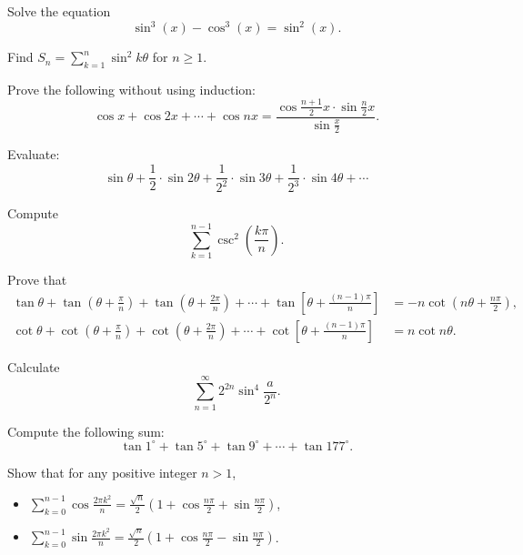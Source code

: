 \begin{question} Solve the equation \[ \sin^3 \left( x \right) - \cos^3 \left( x \right) = \sin^2 \left( x \right).\]
\end{question}


\begin{question} Find $S_n=\sum_{k=1}^n\sin^2 k\theta$ for $n\geqslant 1$.
\end{question}



\begin{question} Prove the following without using induction:
\[\cos x + \cos 2x + \cdots + \cos nx = \frac{\cos \frac{n+1}{2}x \cdot \sin \frac{n}{2}x}{\sin \frac{x}{2}}.\]
\end{question}


\begin{question} Evaluate:
\[ \sin \theta + \frac{1}{2}\cdot \sin 2 \theta + \frac{1}{2^2} \cdot \sin 3 \theta + \frac{1}{2^3} \cdot \sin 4\theta+\cdots \]
\end{question}


\begin{question} Compute \[\displaystyle \sum_{k=1}^{n-1}\csc^2 \left( \frac{k\pi}{n} \right) .\]
\end{question}


\begin{question} Prove that
\begin{align*}
    \tan\theta+\tan\left(\theta+\frac{\pi}{n}\right)+\tan\left(\theta+\frac{2\pi}{n}\right)+\cdots +\tan\left[\theta+\frac{(n-1)\pi}{n}\right] &=-n\cot\left(n\theta+\frac{n\pi}{2}\right),\\
    \cot\theta+\cot\left(\theta+\frac{\pi}{n}\right)+\cot\left(\theta+\frac{2\pi}{n}\right)+\cdots +\cot\left[\theta+\frac{(n-1)\pi}{n}\right] &=n\cot n\theta.
\end{align*}
\end{question}


\begin{question} Calculate
\[\sum_{n=1}^\infty 2^{2n}\sin^4 \frac{a}{2^n}.\]
\end{question}


\begin{question} Compute the following sum:
\[\tan 1^\circ + \tan 5^\circ +\tan 9^\circ + \cdots +\tan 177^\circ.\]
\end{question}


\begin{question} Show that for any positive integer $n>1$,

\begin{itemize}

\item $\displaystyle \sum_{k=0}^{n-1}\cos\frac{2\pi k^{2}}{n}=\frac{\sqrt{n}}{2}\left(1+\cos\frac{n\pi}{2}+\sin\frac{n\pi}{2}\right)$,

\item $\displaystyle \sum_{k=0}^{n-1}\sin\frac{2\pi k^{2}}{n}=\frac{\sqrt{n}}{2}\left(1+\cos\frac{n\pi}{2}-\sin\frac{n\pi}{2}\right)$.

\end{itemize}
\end{question}

